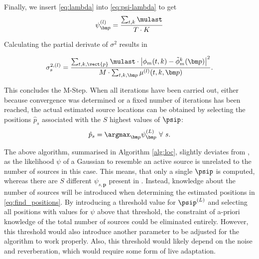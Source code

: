 Finally, we insert \eqref{eq:lambda} into \eqref{eq:psi-lambda} to get
\begin{equation}\label{eq:m_step_psi}
    \psi_{\bm p}^{(l)}=\frac{\sum_{t,k}\mulast}{T\cdot K}
\end{equation}

Calculating the partial derivate of $\sigma^2$ results in

\begin{equation}\label{eq:m_step_var}
    \sigma_s^{2,(l)}=\frac{\sum_{t,k,\vect{p}}\mulast\cdot\left | \phi_m(t,k)-\tilde\phi_m^k(\bm p)\right |^2}{M\cdot \sum_{t,k,\bm p}\mu^{(l)}(t,k,\bm p)}.
\end{equation}

This concludes the M-Step. When all iterations have been carried out, either because convergence was determined or a fixed number of iterations has been reached, the actual estimated source locations can be obtained by selecting the positions $\hat p_s$ associated with the $S$ highest values of $\psip$:
\begin{equation}\label{eq:find_positions}
    \hat p_s=\argmax_{\bm p}\psi_{\bm p}^{(L)}\ \forall\ s.
\end{equation}



The above algorithm, summarised in Algorithm \ref{alg:loc}, slightly deviates from \cite{Schwartz2014}, as the likelihood $\psi$ of a Gaussian to resemble an active source is unrelated to the number of sources in this case. This means, that only a single $\psip$ is computed, whereas there are $S$ different $\psi_{s,\bm p}$ present in \cite{Schwartz2014}. Instead, knowledge about the number of sources will be introduced when determining the estimated positions in \eqref{eq:find_positions}. By introducing a threshold value for $\psip^{(L)}$ and selecting all positions with values for $\psi$ above that threshold, the constraint of a-priori knowledge of the total number of sources could be eliminated entirely. However, this threshold would also introduce another parameter to be adjusted for the algorithm to work properly. Also, this threshold would likely depend on the noise and reverberation, which would require some form of live adaptation.
